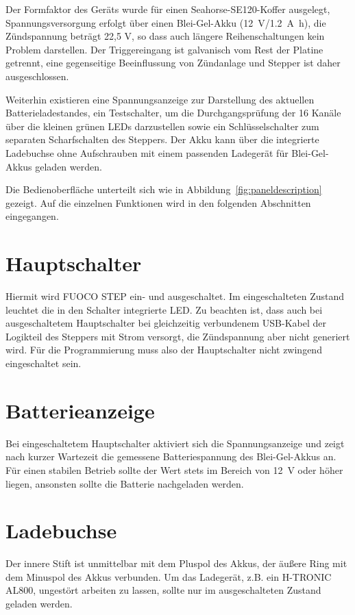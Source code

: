 \documentclass[paper=a4, open=any]{scrbook}
\begin{document}
			Der Formfaktor des Geräts wurde für einen Seahorse-SE120-Koffer ausgelegt, Spannungsversorgung erfolgt über einen Blei-Gel-Akku (\SI{12}{\volt}/\SI{1,2}{\ampere\hour}), die Zündspannung beträgt 22,5 V, so dass auch längere Reihenschaltungen kein Problem darstellen. Der Triggereingang ist galvanisch vom Rest der Platine getrennt, eine gegenseitige Beeinflussung von Zündanlage und Stepper ist daher ausgeschlossen.

			Weiterhin existieren eine Spannungsanzeige zur Darstellung des aktuellen Batterieladestandes, ein Testschalter, um die Durchgangsprüfung der 16 Kanäle über die kleinen grünen LEDs darzustellen sowie ein Schlüsselschalter zum separaten Scharfschalten des Steppers. Der Akku kann über die integrierte Ladebuchse ohne Aufschrauben mit einem passenden Ladegerät für Blei-Gel-Akkus geladen werden.

			Die Bedienoberfläche unterteilt sich wie in Abbildung~\ref{fig:paneldescription} gezeigt. Auf die einzelnen Funktionen wird in den folgenden Abschnitten eingegangen.

			\section{Hauptschalter}

				Hiermit wird FUOCO STEP ein- und ausgeschaltet. Im eingeschalteten Zustand leuchtet die in den Schalter integrierte LED. Zu beachten ist, dass auch bei ausgeschaltetem Hauptschalter bei gleichzeitig verbundenem USB-Kabel der Logikteil des Steppers mit Strom versorgt, die Zündspannung aber nicht generiert wird. Für die Programmierung muss also der Hauptschalter nicht zwingend eingeschaltet sein.

			\section{Batterieanzeige}

				Bei eingeschaltetem Hauptschalter aktiviert sich die Spannungsanzeige und zeigt nach kurzer Wartezeit die gemessene Batteriespannung des Blei-Gel-Akkus an. Für einen stabilen Betrieb sollte der Wert stets im Bereich von \SI{12}{\volt} oder höher liegen, ansonsten sollte die Batterie nachgeladen werden.

			\section{Ladebuchse}

				Der innere Stift ist unmittelbar mit dem Pluspol des Akkus, der äußere Ring mit dem Minuspol des Akkus verbunden. Um das Ladegerät, z.B. ein H-TRONIC AL800, ungestört arbeiten zu lassen, sollte nur im ausgeschalteten Zustand geladen werden.
\end{document}
